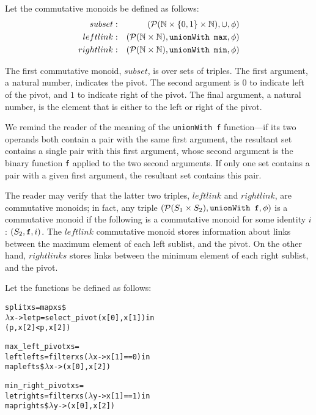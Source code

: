 Let the commutative monoids be defined as follows:
\begin{eqnarray*}
subset &:& \left(\mathcal{P}(\mathbb{N} \times \{0,1\} \times \mathbb{N}), \cup, \phi\right) \\
leftlink &:& \left(\mathcal{P}(\mathbb{N} \times \mathbb{N}), {\tt unionWith \,\,\,max}, \phi\right) \\
rightlink &:& \left(\mathcal{P}(\mathbb{N} \times \mathbb{N}), {\tt unionWith \,\,\,min}, \phi \right)
\end{eqnarray*}

The first commutative monoid, $subset$, is over sets of triples.  The first argument, a natural number, indicates the pivot.  The second argument is $0$ to indicate left of the pivot, and $1$ to indicate right of the pivot.  The final argument, a natural number, is the element that is either to the left or right of the pivot.

We remind the reader of the meaning of the {\tt unionWith f} function---if its two operands both contain a pair with the same first argument, the resultant set contains a single pair with this first argument, whose second argument is the binary function {\tt f} applied to the two second arguments.  If only one set contains a pair with a given first argument, the resultant set contains this pair.

The reader may verify that the latter two triples, $leftlink$ and $rightlink$, are commutative monoids; in fact, any triple $\left(\mathcal{P}(S_1 \times S_2), {\tt unionWith \,\,\, f}, \phi\right)$ is a commutative monoid if the following is a commutative monoid for some identity $i$: $\left(S_2, {\tt f}, i\right)$.  The $leftlink$ commutative monoid stores information about links between the maximum element of each left sublist, and the pivot.  On the other hand, $rightlinks$ stores links between the minimum element of each right sublist, and the pivot.

Let the functions be defined as follows:
\begin{alltt}
split xs = map xs \$
    \(\lambda\)x -> let p = select_pivot(x[0], x[1]) in
        (p, x[2] < p, x[2])

max\_left\_pivot xs = 
    left lefts = filter xs (\(\lambda\)x -> x[1] == 0) in
        map lefts \$ \(\lambda\)x -> (x[0], x[2])

min\_right\_pivot xs = 
    let rights = filter xs (\(\lambda\)y -> x[1] == 1) in
        map rights \$ \(\lambda\)y -> (x[0], x[2])
\end{alltt}


